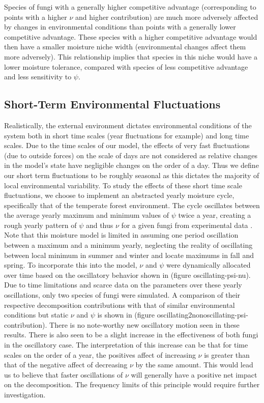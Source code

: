 \documentclass{article}
\begin{document}
Species of fungi with a generally higher competitive advantage (corresponding to points with a higher $\nu$ and higher contribution) are much more adversely affected by changes in environmental conditions than points with a generally lower competitive advantage. These species with a higher competitive advantage would then have a smaller moisture niche width (environmental changes affect them more adversely). This relationship implies that species in this niche would have a lower moisture tolerance, compared with species of less competitive advantage and less sensitivity to $\psi$. %

\subsection{Short-Term Environmental Fluctuations}
Realistically, the external environment dictates environmental conditions of the system both in short time scales (year fluctuations for example) and long time scales. Due to the time scales of our model, the effects of very fast fluctuations (due to outside forces) on the scale of days are not considered as relative changes in the model's state have negligible changes on the order of a day. Thus we define our short term fluctuations to be roughly seasonal as this dictates the majority of local environmental variability. To study the effects of these short time scale fluctuations, we choose to implement an abstracted yearly moisture cycle, specifically that of the temperate forest environment. The cycle oscillates between the average yearly maximum and minimum values of $\psi$ twice a year, creating a rough yearly pattern of $\psi$ and thus $\nu$ for a given fungi from experimental data \cite{Zobel2001}\cite{Maynard2019}. Note that this moisture model is limited in assuming one period oscillation between a maximum and a minimum yearly, neglecting the reality of oscillating between local minimum in summer and winter and locate maximums in fall and spring. To incorporate this into the model, $\nu$ and $\psi$ were dynamically allocated over time based on the oscillatory behavior shown in (figure oscillating-psi-nu). Due to time limitations and scarce data on the parameters over these yearly oscillations, only two species of fungi were simulated. A comparison of their respective decomposition contributions with that of similar environmental conditions but static $\nu$ and $\psi$ is shown in (figure oscillating2nonoscillating-psi-contribution). There is no note-worthy new oscillatory motion seen in these results. There is also seen to be a slight increase in the effectiveness of both fungi in the oscillatory case. The interpretation of this increase can be that for time scales on the order of a year, the positives affect of increasing $\nu$ is greater than that of the negative affect of decreasing $\nu$ by the same amount. This would lead us to believe that faster oscillations of $\nu$ will generally have a positive net impact on the decomposition. The frequency limits of this principle would require further investigation.
\end{document}
